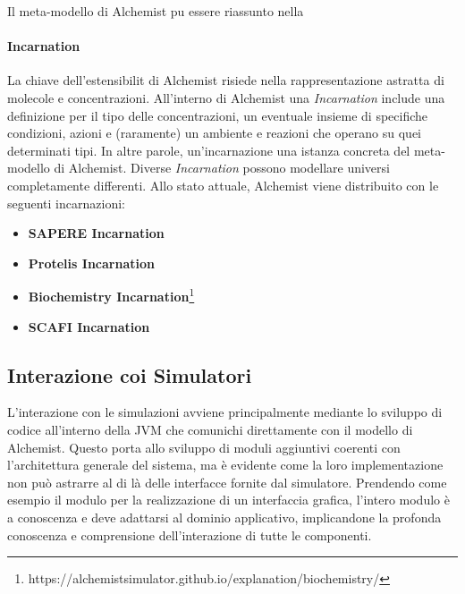 Il meta-modello di Alchemist pu essere riassunto nella 


\paragraph{Incarnation}\label{}
La chiave dell'estensibilit di Alchemist risiede nella rappresentazione astratta di molecole e concentrazioni.
All'interno di Alchemist una \textit{Incarnation} include una definizione per il tipo delle concentrazioni, un eventuale insieme di specifiche
condizioni, azioni e (raramente) un ambiente e reazioni che operano su quei determinati tipi. In altre parole, un'incarnazione  una
istanza concreta del meta-modello di Alchemist.
%
Diverse \textit{Incarnation} possono modellare universi completamente differenti. Allo stato attuale, Alchemist viene distribuito con le seguenti incarnazioni:
\begin{itemize}
    \item \textbf{SAPERE Incarnation}~\cite{sapere}
    \item \textbf{Protelis Incarnation}~\cite{protelis}
    \item \textbf{Biochemistry Incarnation}\footnote{https://alchemistsimulator.github.io/explanation/biochemistry/}
    \item \textbf{SCAFI Incarnation}~\cite{CASADEI2022101248}
\end{itemize}

\subsection{Interazione coi Simulatori}\label{ssec:sim-interactions}
L'interazione con le simulazioni avviene principalmente mediante lo sviluppo di codice all'interno della \ac{JVM} che comunichi direttamente con il modello di Alchemist.
Questo porta allo sviluppo di moduli aggiuntivi coerenti con l'architettura generale del sistema, ma è evidente come la loro implementazione non può astrarre al di là delle interfacce fornite
dal simulatore. Prendendo come esempio il modulo per la realizzazione di un interfaccia grafica, l'intero modulo è a conoscenza e deve adattarsi al dominio applicativo, implicandone 
la profonda conoscenza e comprensione dell'interazione di tutte le componenti.

